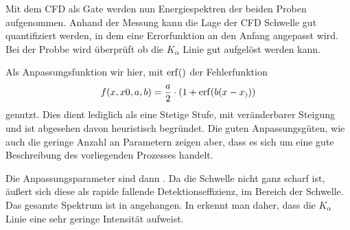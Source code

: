 Mit dem CFD als Gate werden nun Energiespektren der beiden Proben aufgenommen. Anhand der \na Messung kann die Lage der CFD Schwelle gut quantifiziert werden, in dem eine Errorfunktion an den Anfang angepasst wird. Bei der \ba Probbe wird überprüft ob die $K_\alpha$ Linie gut aufgelöst werden kann. 

Als Anpassungsfunktion wir hier, mit $\erf()$ der Fehlerfunktion \cite[11]{525va}
\begin{align}
	f(x, x0, a, b) = \frac{a}{2} \cdot (1 + \erf(b (x - x_)))
\end{align}
genutzt. Dies dient lediglich als eine Stetige Stufe, mit veränderbarer Steigung und ist abgesehen davon heuristisch begründet. Die guten Anpassungsgüten, wie auch die geringe Anzahl an Parametern zeigen aber, dass es sich um eine gute Beschreibung des vorliegenden Prozesses handelt.


Die Anpassungsparameter sind dann . Da die Schwelle nicht ganz scharf ist, äußert sich diese als rapide fallende Detektionseffizienz, im Bereich der Schwelle. Das gesamte \na Spektrum ist in  angehangen.
In  erkennt man daher, dass die $K_\alpha$ Linie eine sehr geringe Intensität aufweist.



